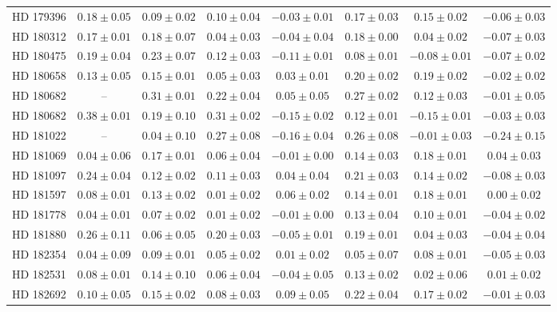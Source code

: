 \begin{table*}
\begin{tabular}{cccccccc}
HD 179396 & $0.18 \pm 0.05$ & $0.09 \pm 0.02$ & $0.10 \pm 0.04$ & $-0.03 \pm 0.01$ & $0.17 \pm 0.03$ & $0.15 \pm 0.02$ & $-0.06 \pm 0.03$ \\
HD 180312 & $0.17 \pm 0.01$ & $0.18 \pm 0.07$ & $0.04 \pm 0.03$ & $-0.04 \pm 0.04$ & $0.18 \pm 0.00$ & $0.04 \pm 0.02$ & $-0.07 \pm 0.03$ \\
HD 180475 & $0.19 \pm 0.04$ & $0.23 \pm 0.07$ & $0.12 \pm 0.03$ & $-0.11 \pm 0.01$ & $0.08 \pm 0.01$ & $-0.08 \pm 0.01$ & $-0.07 \pm 0.02$ \\
HD 180658 & $0.13 \pm 0.05$ & $0.15 \pm 0.01$ & $0.05 \pm 0.03$ & $0.03 \pm 0.01$ & $0.20 \pm 0.02$ & $0.19 \pm 0.02$ & $-0.02 \pm 0.02$ \\
HD 180682 & -- & $0.31 \pm 0.01$ & $0.22 \pm 0.04$ & $0.05 \pm 0.05$ & $0.27 \pm 0.02$ & $0.12 \pm 0.03$ & $-0.01 \pm 0.05$ \\
HD 180682 & $0.38 \pm 0.01$ & $0.19 \pm 0.10$ & $0.31 \pm 0.02$ & $-0.15 \pm 0.02$ & $0.12 \pm 0.01$ & $-0.15 \pm 0.01$ & $-0.03 \pm 0.03$ \\
HD 181022 & -- & $0.04 \pm 0.10$ & $0.27 \pm 0.08$ & $-0.16 \pm 0.04$ & $0.26 \pm 0.08$ & $-0.01 \pm 0.03$ & $-0.24 \pm 0.15$ \\
HD 181069 & $0.04 \pm 0.06$ & $0.17 \pm 0.01$ & $0.06 \pm 0.04$ & $-0.01 \pm 0.00$ & $0.14 \pm 0.03$ & $0.18 \pm 0.01$ & $0.04 \pm 0.03$ \\
HD 181097 & $0.24 \pm 0.04$ & $0.12 \pm 0.02$ & $0.11 \pm 0.03$ & $0.04 \pm 0.04$ & $0.21 \pm 0.03$ & $0.14 \pm 0.02$ & $-0.08 \pm 0.03$ \\
HD 181597 & $0.08 \pm 0.01$ & $0.13 \pm 0.02$ & $0.01 \pm 0.02$ & $0.06 \pm 0.02$ & $0.14 \pm 0.01$ & $0.18 \pm 0.01$ & $0.00 \pm 0.02$ \\
HD 181778 & $0.04 \pm 0.01$ & $0.07 \pm 0.02$ & $0.01 \pm 0.02$ & $-0.01 \pm 0.00$ & $0.13 \pm 0.04$ & $0.10 \pm 0.01$ & $-0.04 \pm 0.02$ \\
HD 181880 & $0.26 \pm 0.11$ & $0.06 \pm 0.05$ & $0.20 \pm 0.03$ & $-0.05 \pm 0.01$ & $0.19 \pm 0.01$ & $0.04 \pm 0.03$ & $-0.04 \pm 0.04$ \\
HD 182354 & $0.04 \pm 0.09$ & $0.09 \pm 0.01$ & $0.05 \pm 0.02$ & $0.01 \pm 0.02$ & $0.05 \pm 0.07$ & $0.08 \pm 0.01$ & $-0.05 \pm 0.03$ \\
HD 182531 & $0.08 \pm 0.01$ & $0.14 \pm 0.10$ & $0.06 \pm 0.04$ & $-0.04 \pm 0.05$ & $0.13 \pm 0.02$ & $0.02 \pm 0.06$ & $0.01 \pm 0.02$ \\
HD 182692 & $0.10 \pm 0.05$ & $0.15 \pm 0.02$ & $0.08 \pm 0.03$ & $0.09 \pm 0.05$ & $0.22 \pm 0.04$ & $0.17 \pm 0.02$ & $-0.01 \pm 0.03$ \\

\end{tabular}
\end{table*}
